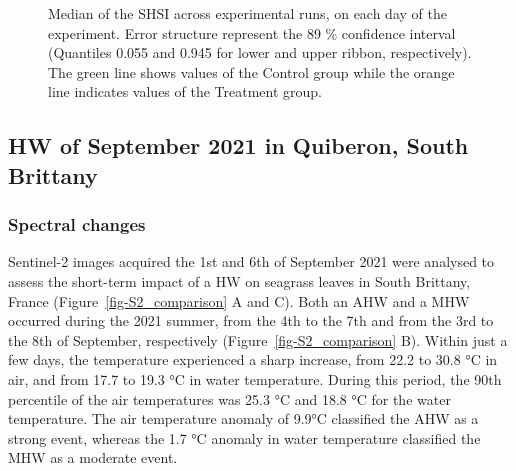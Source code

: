 \documentclass[
  letterpaper,
  11pt,
  english,
  singlespacing,
  headsepline]{MastersDoctoralThesis}
\begin{document}
\begin{spacing}{1.5}
\begin{figure}


\caption{\label{fig-SDI_over_Time_h}Median of the SHSI across
experimental runs, on each day of the experiment. Error structure
represent the 89 \% confidence interval (Quantiles 0.055 and 0.945 for
lower and upper ribbon, respectively). The green line shows values of
the Control group while the orange line indicates values of the
Treatment group.}

\end{figure}%

\subsection{HW of September 2021 in Quiberon, South
Brittany}\label{hw-of-september-2021-in-quiberon-south-brittany}

\subsubsection{Spectral changes}\label{spectral-changes}

Sentinel-2 images acquired the 1st and 6th of September 2021 were
analysed to assess the short-term impact of a HW on seagrass leaves in
South Brittany, France (Figure~\ref{fig-S2_comparison} A and C). Both an
AHW and a MHW occurred during the 2021 summer, from the 4th to the 7th
and from the 3rd to the 8th of September, respectively
(Figure~\ref{fig-S2_comparison} B). Within just a few days, the
temperature experienced a sharp increase, from 22.2 to 30.8 °C in air,
and from 17.7 to 19.3 °C in water temperature. During this period, the
90th percentile of the air temperatures was 25.3 °C and 18.8 °C for the
water temperature. The air temperature anomaly of 9.9°C classified the
AHW as a strong event, whereas the 1.7 °C anomaly in water temperature
classified the MHW as a moderate event.


\end{spacing}
\end{document}
